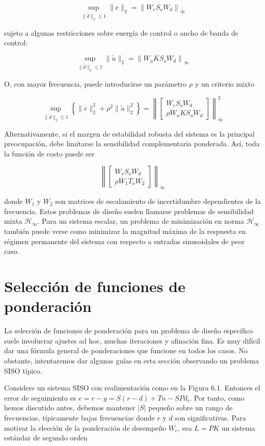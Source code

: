 $$
\sup _{\|\tilde{d}\|_{2} \leq 1}\|e\|_{2}=\left\|W_{e} S_{o} W_{d}\right\|_{\infty}
$$

sujeto a algunas restricciones sobre energía de control o ancho de banda de control:

$$
\sup _{\|\tilde{d}\|_{2} \leq 1}\|\tilde{u}\|_{2}=\left\|W_{u} K S_{o} W_{d}\right\|_{\infty}
$$

O, con mayor frecuencia, puede introducirse un parámetro $\rho$ y un criterio mixto

$$
\sup _{\|\tilde{d}\|_{2} \leq 1}\left\{\|e\|_{2}^{2}+\rho^{2}\|\tilde{u}\|_{2}^{2}\right\}=\left\|\left[\begin{array}{c}
W_{e} S_{o} W_{d} \\
\rho W_{u} K S_{o} W_{d}
\end{array}\right]\right\|_{\infty}^{2}
$$

Alternativamente, si el margen de estabilidad robusta del sistema es la principal preocupación, debe limitarse la sensibilidad complementaria ponderada. Así, toda la función de costo puede ser

$$
\left\|\left[\begin{array}{c}
W_{e} S_{o} W_{d} \\
\rho W_{1} T_{o} W_{2}
\end{array}\right]\right\|_{\infty}
$$

donde $W_{1}$ y $W_{2}$ son matrices de escalamiento de incertidumbre dependientes de la frecuencia. Estos problemas de diseño suelen llamarse problemas de sensibilidad mixta $\mathcal{H}_{\infty}$. Para un sistema escalar, un problema de minimización en norma $\mathcal{H}_{\infty}$ también puede verse como minimizar la magnitud máxima de la respuesta en régimen permanente del sistema con respecto a entradas sinusoidales de peor caso.

\section{Selección de funciones de ponderación}
La selección de funciones de ponderación para un problema de diseño específico suele involucrar ajustes ad hoc, muchas iteraciones y afinación fina. Es muy difícil dar una fórmula general de ponderaciones que funcione en todos los casos. No obstante, intentaremos dar algunas guías en esta sección observando un problema SISO típico.

Considere un sistema SISO con realimentación como en la Figura 6.1. Entonces el error de seguimiento es $e=r-y=S(r-d)+T n-S P d_{i}$. Por tanto, como hemos discutido antes, debemos mantener $|S|$ pequeño sobre un rango de frecuencias, típicamente bajas frecuencias donde $r$ y $d$ son significativas. Para motivar la elección de la ponderación de desempeño $W_{e}$, sea $L=P K$ un sistema estándar de segundo orden

